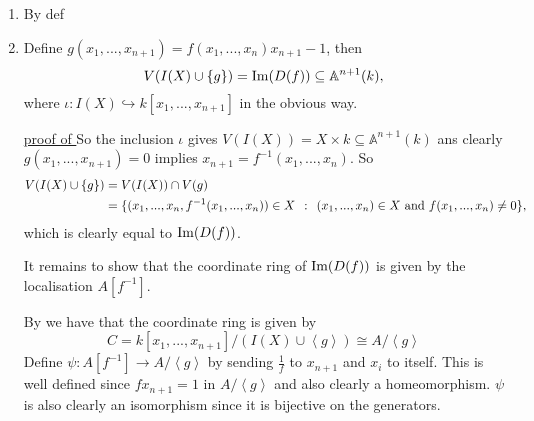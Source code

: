 \documentclass[a4paper,11pt,english]{article}
\def\A{\mathbb{A}}
\begin{document}
\begin{solution}[3]
\begin{enumerate}
\item By def
\item
Define $g(x_1, ..., x_{n+1}) = f(x_1, ..., x_n)x_{n+1} - 1$, then 
\begin{equation}
V(I(X)\cup\{g\}) = \im(D(f)) \subseteq \A^{n+1}(k),
\label{eq:*}
\end{equation}
where $\iota : I(X) \hookrightarrow k[x_1,..., x_{n+1}]$ in the obvious way.

\underline{proof of } 
So the inclusion $\iota$ gives $V(I(X)) = X \times k \subseteq \A^{n+1}(k)$ ans clearly $g(x_1, ..., x_{n+1}) = 0$ implies $x_{n+1} = f^{-1}(x_1,...,x_n)$. So 
\begin{align*}
V(I(X) \cup \{g\}) &= V(I(X)) \cap V(g) \\
&= \{ (x_1,...,x_n, f^{-1}(x_1,...,x_n)) \in X \:\::\:\: (x_1,...,x_n) \in X \text{ and } f(x_1, ..., x_n) \ne 0 \}, 
\end{align*}
which is clearly equal to $\operatorname{Im}(D(f))$.

It remains to show that the coordinate ring of $\operatorname{Im}(D(f))$ is given by the localisation $A[f^{-1}]$.

By  we have that the coordinate ring is given by 
\[ C = k[x_1,...,x_{n+1}] / (I(X)\cup \left<g\right>) \cong  A / \left<g\right> \]
Define $\psi: A[f^{-1}] \to A / \left<g\right>$ by sending $\frac{1}{f}$ to $x_{n+1}$ and $x_i$ to itself. This is well defined since $f x_{n+1} = 1$ in $A / \left<g\right>$ and also clearly a homeomorphism. $\psi$ is also clearly an isomorphism since it is bijective on the generators.
\end{enumerate}

\end{solution}


\begin{solution}[4]

\end{solution}
\end{document}
